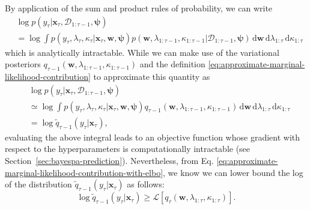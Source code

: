 By application of the sum and product rules of probability, we can write
\begin{equation}
\begin{split}
	& \log p(y_\tau|\mathbf{x}_\tau, \mathcal{D}_{1:\tau-1}, \boldsymbol{\psi})
	\\	
	&= \log \int p(y_\tau, \lambda_\tau, \kappa_\tau|\mathbf{x}_\tau, \mathbf{w}, \boldsymbol{\psi})p(\mathbf{w}, \lambda_{1:\tau-1}, \kappa_{1:\tau-1}|\mathcal{D}_{1:\tau-1}, \boldsymbol{\psi})\,\mathrm{d}\mathbf{w}\,\mathrm{d}\lambda_{1:\tau}\,\mathrm{d}\kappa_{1:\tau}
\end{split}
\end{equation}
which is analytically intractable. While we can make use of the variational posteriors $q_{\tau-1}(\mathbf{w}, \lambda_{1:\tau-1}, \kappa_{1:\tau-1})$ and the definition \eqref{eq:approximate-marginal-likelihood-contribution} to approximate this quantity as
\begin{equation}
\begin{split}
	& \log p(y_\tau|\mathbf{x}_\tau, \mathcal{D}_{1:\tau-1}, \boldsymbol{\psi})
	\\
	&\simeq \log \int p(y_\tau, \lambda_\tau, \kappa_\tau|\mathbf{x}_\tau, \mathbf{w}, \boldsymbol{\psi})q_{\tau-1}(\mathbf{w}, \lambda_{1:\tau-1}, \kappa_{1:\tau-1})\,\mathrm{d}\mathbf{w}\,\mathrm{d}\lambda_{1:\tau}\,\mathrm{d}\kappa_{1:\tau}
	\\	
	&= \log \widetilde{q}_{\tau-1}(y_\tau|\mathbf{x}_
	\tau),
\end{split}
\end{equation}
evaluating the above integral leads to an objective function whose gradient with respect to the hyperparameters is computationally intractable (see Section~\ref{sec:bayespa-prediction}). Nevertheless, from Eq. \eqref{eq:approximate-marginal-likelihood-contribution-with-elbo}, we know we can lower bound the log of the distribution $\widetilde{q}_{\tau-1}(y_\tau|\mathbf{x}_\tau)$ as follows:
\begin{equation}
	\log \widetilde{q}_{\tau-1}(y_\tau|\mathbf{x}_
	\tau)
	\geq \mathcal{L}[q_{\tau}(\mathbf{w}, \lambda_{1:\tau}, \kappa_{1:\tau})].
\end{equation}

